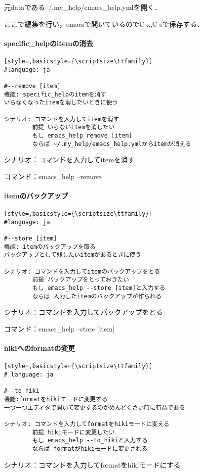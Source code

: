元dataである~/.my\_help/emacs\_help.ymlを開く．

ここで編集を行い，emacsで開いているのでC-x,C-sで保存する．

\paragraph{specific\_helpのitemの消去}\begin{lstlisting}[style=,basicstyle={\scriptsize\ttfamily}]
#language: ja

#--remove [item]
機能: specific_helpのitemを消す
いらなくなったitemを消したいときに使う

シナリオ: コマンドを入力してitemを消す
        前提 いらないitemを消したい
        もし emacs_help remove [item]
        ならば ~/.my_help/emacs_help.ymlからitemが消える

\end{lstlisting}
シナリオ：コマンドを入力してitemを消す

コマンド：emacs\_help --remove

\paragraph{itemのバックアップ}\begin{lstlisting}[style=,basicstyle={\scriptsize\ttfamily}]
#language: ja

#--store [item]
機能: itemのバックアップを取る
バックアップとして残したいitemがあるときに使う

シナリオ: コマンドを入力してitemのバックアップをとる
        前提 バックアップをとっておきたい
        もし emacs_help --store [item]と入力する
        ならば 入力したitemのバックアップが作られる
\end{lstlisting}
シナリオ：コマンドを入力してバックアップをとる

コマンド：emacs\_help --store [item]

\paragraph{hikiへのformatの変更}\begin{lstlisting}[style=,basicstyle={\scriptsize\ttfamily}]
# language: ja

#--to_hiki
機能:formatをhikiモードに変更する
一つ一つエディタで開いて変更するのがめんどくさい時に有益である

シナリオ: コマンドを入力してformatをhikiモードに変える
        前提 hikiモードに変更したい
        もし emacs_help --to_hikiと入力する
        ならば formatがhikiモードに変更される
\end{lstlisting}
シナリオ：コマンドを入力してformatをhikiモードにする

